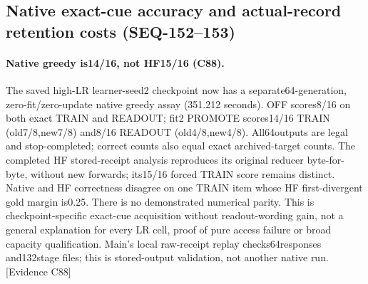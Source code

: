 \documentclass[11pt]{article}
\begin{document}
\subsection{Native exact-cue accuracy and actual-record retention costs (SEQ-152--153)}
\label{sec:seq153-extension}
\paragraph{Native greedy is14/16, not HF15/16 (C88).}
The saved high-LR learner-seed2 checkpoint now has a separate64-generation,
zero-fit/zero-update native greedy assay (351.212 seconds). OFF scores8/16 on
both exact TRAIN and READOUT; fit2 PROMOTE scores14/16 TRAIN (old7/8,new7/8)
and8/16 READOUT (old4/8,new4/8). All64outputs are legal and stop-completed;
correct counts also equal exact archived-target counts. The completed HF
stored-receipt analysis reproduces its original reducer byte-for-byte, without
new forwards; its15/16 forced TRAIN score remains distinct. Native and HF
correctness disagree on one TRAIN item whose HF first-divergent gold margin
is0.25. There is no demonstrated numerical parity. This is checkpoint-specific
exact-cue acquisition without readout-wording gain, not a general explanation
for every LR cell, proof of pure access failure or broad capacity qualification.
Main's local raw-receipt replay checks64responses and132stage files; this is
stored-output validation, not another native run. \textsf{[Evidence C88]}
\end{document}
